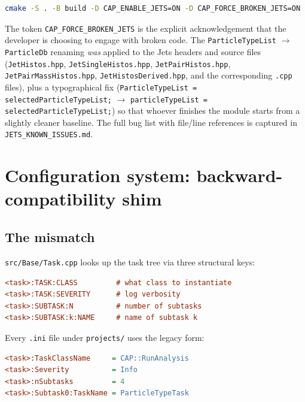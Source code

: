 \documentclass[11pt,a4paper]{article}
\begin{document}
\begin{lstlisting}[language=bash]
cmake -S . -B build -D CAP_ENABLE_JETS=ON -D CAP_FORCE_BROKEN_JETS=ON
\end{lstlisting}

\noindent
The token \texttt{CAP\_FORCE\_BROKEN\_JETS} is the explicit acknowledgement
that the developer is choosing to engage with broken code. The
\texttt{ParticleTypeList} $\to$ \texttt{ParticleDb} renaming
\emph{was} applied to the Jets headers and source files
(\texttt{JetHistos.hpp}, \texttt{JetSingleHistos.hpp},
\texttt{JetPairHistos.hpp}, \texttt{JetPairMassHistos.hpp},
\texttt{JetHistosDerived.hpp}, and the corresponding \texttt{.cpp} files),
plus a typographical fix
(\texttt{ParticleTypeList = selectedParticleTypeList;} $\to$
\texttt{particleTypeList = selectedParticleTypeList;}) so that whoever
finishes the module starts from a slightly cleaner baseline. The full bug
list with file/line references is captured in
\texttt{JETS\_KNOWN\_ISSUES.md}.

\section{Configuration system: backward-compatibility shim}
\label{sec:taskpatch}

\subsection{The mismatch}

\texttt{src/Base/Task.cpp} looks up the task tree via three structural keys:

\begin{lstlisting}[language=ini]
<task>:TASK:CLASS         # what class to instantiate
<task>:TASK:SEVERITY      # log verbosity
<task>:SUBTASK:N          # number of subtasks
<task>:SUBTASK:k:NAME     # name of subtask k
\end{lstlisting}

\noindent
Every \texttt{.ini} file under \texttt{projects/} uses the legacy form:

\begin{lstlisting}[language=ini]
<task>:TaskClassName     = CAP::RunAnalysis
<task>:Severity          = Info
<task>:nSubtasks         = 4
<task>:Subtask0:TaskName = ParticleTypeTask
\end{lstlisting}
\end{document}
